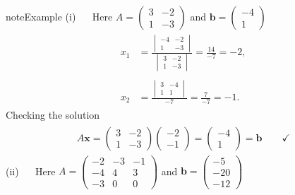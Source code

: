 \documentclass[letterpaper,10pt,english]{jupyterBook}
\begin{document}
\begin{sphinxadmonition}{note}{Example }
\sphinxAtStartPar
(i)   Here \(A = \begin{pmatrix} 3 & -2 \\ 1 & -3 \end{pmatrix}\) and \(\mathbf{b} = \begin{pmatrix} -4 \\ 1 \end{pmatrix}\)
\begin{equation*}
\begin{split} \begin{align*}
    x_1 &= \frac{
    \begin{vmatrix} -4 & -2 \\ 1 & -3 \end{vmatrix}}
    {\begin{vmatrix} 3 & -2 \\ 1 & -3 \end{vmatrix}} = \frac{14}{-7} = -2,  \\
    \\
    x_2 &= \frac{\begin{vmatrix} 3 & -4 \\ 1 & 1 \end{vmatrix}}{-7} =
    \frac{7}{-7} = -1.
\end{align*} \end{split}
\end{equation*}
\sphinxAtStartPar
Checking the solution
\begin{equation*}
\begin{split} \begin{align*}
    A\mathbf{x} = \begin{pmatrix} 3 & -2 \\ 1 & -3 \end{pmatrix}
    \begin{pmatrix} -2 \\ -1 \end{pmatrix} =
    \begin{pmatrix} -4 \\ 1 \end{pmatrix} = \mathbf{b} \qquad \checkmark
\end{align*} \end{split}
\end{equation*}
\sphinxAtStartPar
(ii)   Here \(A = \begin{pmatrix} -2 & -3 & -1 \\ -4 & 4 & 3 \\ -3 & 0 & 0 \end{pmatrix}\) and \(\mathbf{b} = \begin{pmatrix} -5 \\ -20 \\ -12 \end{pmatrix}\)

\end{sphinxadmonition}
\end{document}

